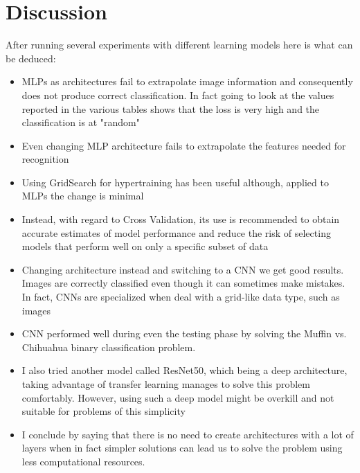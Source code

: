 \chapter{Discussion} \label{ch:discussion}
After running several experiments with different learning models here is what can be deduced:
\begin{itemize}
\item MLPs as architectures fail to extrapolate image information and consequently does not produce correct classification. In fact going to look at the values reported in the various tables shows that the loss is very high and the classification is at "random"
\item Even changing MLP architecture fails to extrapolate the features needed for recognition
\item Using GridSearch for hypertraining has been useful although, applied to MLPs the change is minimal
\item Instead, with regard to Cross Validation, its use is recommended to obtain accurate estimates of model performance and reduce the risk of selecting models that perform well on only a specific subset of data 
\item Changing architecture instead and switching to a CNN we get good results. Images are correctly classified even though it can sometimes make mistakes. In fact, CNNs are specialized when deal with a grid-like data type, such as images
\item CNN performed well during even the testing phase by solving the Muffin vs. Chihuahua binary classification problem.
\item I also tried another model called ResNet50, which being a deep architecture, taking advantage of transfer learning manages to solve this problem comfortably.  However, using such a deep model might be overkill and not suitable for problems of this simplicity
\item I conclude by saying that there is no need to create architectures with a lot of layers when in fact simpler solutions can lead us to solve the problem using less computational resources.
\end{itemize}